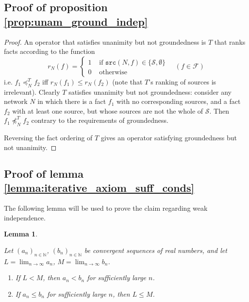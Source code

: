 \documentclass{article}
\theoremstyle{definition} \newtheorem{definition}{Definition}
\theoremstyle{definition} \newtheorem{example}{Example}
\theoremstyle{plain} \newtheorem{axiom}{Axiom}
\theoremstyle{plain} \newtheorem*{remark}{Remark}
\theoremstyle{remark} \newtheorem*{notation}{Notation}
\theoremstyle{plain} \newtheorem{lemma}{Lemma}
\theoremstyle{plain} \newtheorem{theorem}{Theorem}
\theoremstyle{plain} \newtheorem{proposition}{Proposition}
\renewcommand{\S}{\mathcal{S}}  %
\newcommand{\F}{\mathcal{F}}
\newcommand{\Nat}{\mathbb{N}}
\newcommand{\fle}{\preceq}
\newcommand{\src}{\texttt{src}}
\begin{document}
\subsection{Proof of proposition \ref{prop:unam_ground_indep}}
\begin{proof}

An operator that satisfies unanimity but not groundedness is $T$ that ranks
facts according to the function
$$
    r_N(f) = \begin{cases}
        1 & \text{ if } \src(N, f) \in \{\S, \emptyset\} \\
        0 & \text{ otherwise}
    \end{cases}
    \quad (f \in \F)
$$
i.e. $f_1 \fle_N^T f_2$ iff $r_N(f_1) \le r_N(f_2)$ (note that $T$'s ranking of
sources is irrelevant). Clearly $T$ satisfies unanimity but not groundedness:
consider any network $N$ in which there is a fact $f_1$ with no corresponding
sources, and a fact $f_2$ with at least one source, but whose sources are not
the whole of $\S$. Then $f_1 \not\fle_N^T f_2$ contrary to the requirements of
groundedness.

Reversing the fact ordering of $T$ gives an operator satisfying groundedness
but not unanimity.

\end{proof}

\subsection{Proof of lemma \ref{lemma:iterative_axiom_suff_conds}}

The following lemma will be used to prove the claim regarding weak
independence.

\begin{lemma}
\label{lemma:sequence_lemma}

Let $(a_n)_{n \in \Nat}$, $(b_n)_{n \in \Nat}$ be convergent sequences of real
numbers, and let $L = \lim_{n \rightarrow \infty}a_n$, $M = \lim_{n \rightarrow
\infty}b_n$.
\begin{enumerate}
    \item If $L < M$, then $a_n < b_n$ for sufficiently large $n$.
    \item If $a_n \le b_n$ for sufficiently large $n$, then $L \le M$.
\end{enumerate}
\end{lemma}
\end{document}
